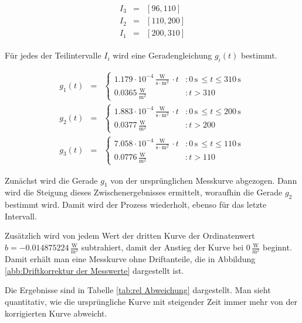 \documentclass[12pt,a4paper]{scrartcl}
\numberwithin{equation}{section} %
\begin{document}
\begin{eqnarray}
	\begin{split}
		I_3 &=& [96,110] \\
		I_2 &=& [110,200] \\
		I_1 &=& [200,310]
	\end{split}
\end{eqnarray}

\noindent
Für jedes der Teilintervalle $I_i$ wird eine Geradengleichung $g_i(t)$ bestimmt.

\begin{eqnarray}
	g_1(t) &=&
	\begin{cases}
		1.179 \cdot 10^{-4} \mathrm{\,\frac{W}{s\cdot m^2}\,} \cdot t &: 0\mathrm{\,s\,}\leq t \leq 310 \mathrm{\,s\,} \\
		0.0365 \mathrm{\,\frac{W}{m^2}} &: t > 310
	\end{cases} \\
	g_2(t) &=&
	\begin{cases}
		1.883 \cdot 10^{-4} \mathrm{\,\frac{W}{s\cdot m^2}\,} \cdot t &: 0\mathrm{\,s\,}\leq t \leq 200 \mathrm{\,s\,} \\
		0.0377 \mathrm{\,\frac{W}{m^2}} &: t > 200
	\end{cases} \\
	g_3(t) &=&
	\begin{cases}
		7.058\cdot 10^{-4} \mathrm{\,\frac{W}{s\cdot m^2}\,} \cdot t &: 0\mathrm{\,s\,}\leq t \leq 110 \mathrm{\,s\,} \\
		0.0776 \mathrm{\,\frac{W}{m^2}} &: t > 110
	\end{cases}
\end{eqnarray}

\noindent
Zunächst wird die Gerade $g_1$ von der ursprünglichen Messkurve abgezogen. Dann wird die Steigung dieses Zwischenergebnisses ermittelt, woraufhin die Gerade $g_2$ bestimmt wird. Damit wird der Prozess wiederholt, ebenso für das letzte Intervall.

Zusätzlich wird von jedem Wert der dritten Kurve der Ordinatenwert $b=-0.014875224 \mathrm{\,\frac{W}{m^2}}$ subtrahiert, damit der Anstieg der Kurve bei $0\mathrm{\,\frac{W}{m^2}}$ beginnt. Damit erhält man eine Messkurve ohne Driftanteile, die in Abbildung \ref{abb:Driftkorrektur der Messwerte} dargestellt ist.

Die Ergebnisse sind in Tabelle \ref{tab:rel Abweichung} dargestellt. Man sieht quantitativ, wie die ursprüngliche Kurve mit steigender Zeit immer mehr von der korrigierten Kurve abweicht.
\end{document}
